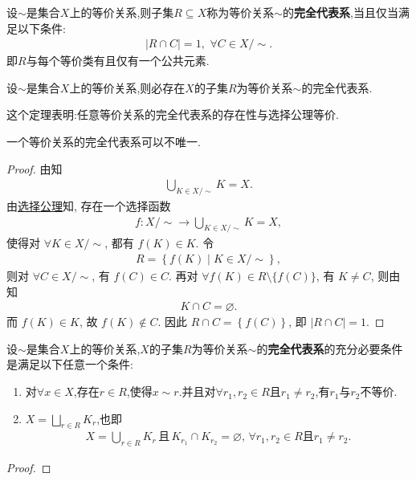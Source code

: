 \documentclass[../../main.tex]{subfiles}%
\begin{document}
\begin{definition}[完全代表系]\label{definition:等价类的完全代表系}
设$\sim$是集合$X$上的等价关系,则子集$R\subseteq X$称为等价关系$\sim$的\textbf{完全代表系},当且仅当满足以下条件:
\begin{align*}
|R\cap C|=1,\,\,\forall C\in X/\sim .
\end{align*}
即$R$与每个等价类有且仅有一个公共元素.
\end{definition}

\begin{theorem}\label{theorem:等价关系的完全代表系的存在性}
设$\sim $是集合$X$上的等价关系,则必存在$X$的子集$R$为等价关系$\sim$的完全代表系.
\end{theorem}
\begin{remark}
这个定理表明:任意等价关系的完全代表系的存在性与选择公理等价.

一个等价关系的完全代表系可以不唯一.
\end{remark}
\begin{proof}

由知
\begin{align*}
\bigcup_{K\in X/\sim} K = X.
\end{align*}
由\hyperref[axiom:选择公理]{选择公理}知, 存在一个选择函数
\begin{align*}
f: X/\sim \to \bigcup_{K\in X/\sim} K = X,
\end{align*}
使得对 $\forall K\in X/\sim$, 都有 $f(K) \in K$. 令
\begin{align*}
R = \left\{ f(K) \mid K\in X/\sim \right\},
\end{align*}
则对 $\forall C\in X/\sim$, 有 $f(C) \in C$. 再对 $\forall f(K) \in R\setminus \{f(C)\}$, 有 $K\neq C$, 则由知
\begin{align*}
K\cap C = \varnothing.
\end{align*}
而 $f(K) \in K$, 故 $f(K) \notin C$. 因此 $R\cap C = \left\{ f(C) \right\}$, 即 $|R\cap C| = 1$.

\end{proof}

\begin{theorem}
设$\sim$是集合$X$上的等价关系,$X$的子集$R$为等价关系$\sim$的\textbf{完全代表系}的充分必要条件是满足以下任意一个条件:
\begin{enumerate}[(1)]
\item 对$\forall x\in X$,存在$r\in R$,使得$x\sim r$.并且对$\forall r_1,r_2\in R$且$r_1\neq r_2$,有$r_1$与$r_2$不等价.

\item $X=\bigsqcup_{r\in R}K_r$,也即
\begin{align*}
X=\bigcup_{r\in R}{K_r}\,\text{且}\,K_{r_1}\cap K_{r_2}=\varnothing ,\,\forall r_1,r_2\in R\text{且}r_1\ne r_2.
\end{align*}

\end{enumerate}
\end{theorem}
\begin{proof}



\end{proof}
\end{document}
